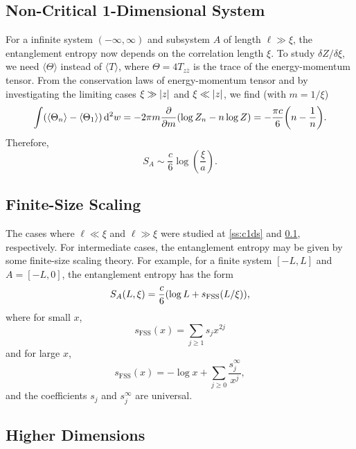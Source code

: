 \documentclass{article}
\begin{document}
\subsection{Non-Critical 1-Dimensional System}
\label{ss:nc1ds}
For a infinite system $(-\infty,\infty)$ and subsystem $A$ of length $\ell \gg \xi$, the entanglement entropy now depends on the correlation length $\xi$.
To study $\delta Z / \delta \xi$, we need $\langle \Theta \rangle$ instead of $\langle T \rangle$, where $\Theta = 4T_{z\overline{z}}$ is the trace of the energy-momentum tensor.
From the conservation laws of energy-momentum tensor and by investigating the limiting cases $\xi \gg \abs{z}$ and $\xi \ll \abs{z}$, we find (with $m=1/\xi$)
\[ \int (\langle \Theta_n \rangle - \langle \Theta_1 \rangle) \dd[2]{w} = -2\pi m\pdv{m}\qty(\log Z_n - n\log Z) = -\frac{\pi c}{6}\qty(n - \frac{1}{n}). \]
Therefore,
\[ S_A \sim \frac{c}{6} \log(\frac{\xi}{a}). \]

\subsection{Finite-Size Scaling}

The cases where $\ell \ll \xi$ and $\ell \gg \xi$ were studied at \cref{ss:c1ds} and \cref{ss:nc1ds}, respectively.
For intermediate cases, the entanglement entropy may be given by some finite-size scaling theory.
For example, for a finite system $[{-L,L}]$ and $A = [{-L,0}]$, the entanglement entropy has the form
\[ S_A(L,\xi) = \frac{c}{6}\qty(\log L + s_{\mathrm{FSS}}(L/\xi)), \]
where for small $x$,
\[ s_{\mathrm{FSS}}(x) = \sum_{j\ge 1} s_j x^{2j} \]
and for large $x$,
\[ s_{\mathrm{FSS}}(x) = -\log x + \sum_{j\ge 0} \frac{s^\infty_j}{x^j}, \]
and the coefficients $s_j$ and $s_j^\infty$ are universal.

\subsection{Higher Dimensions}
\end{document}
